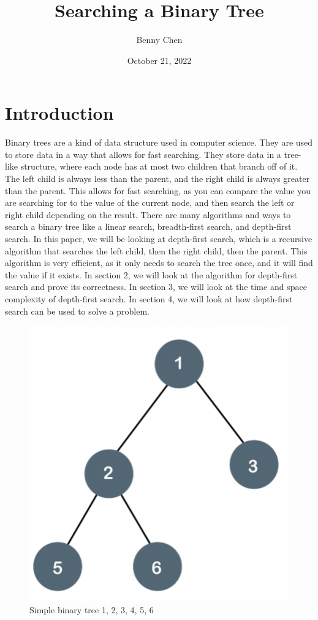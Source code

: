 \documentclass[12pt]{article}
\title{Searching a Binary Tree}
\author{Benny Chen}
\date{October 21, 2022}
\begin{document}
\maketitle

\section{Introduction}
Binary trees are a kind of data structure used in computer science.
They are used to store data in a way that allows for fast searching.
They store data in a tree-like structure, where each node has at most two children that branch off of it.
The left child is always less than the parent, and the right child is always greater than the parent.
This allows for fast searching, as you can compare the value you are searching for to the value of the current node, and then search the left or right child depending on the result.
There are many algorithms and ways to search a binary tree like
a linear search, breadth-first search, and depth-first search.
In this paper, we will be looking at depth-first search, which is a recursive algorithm that searches the left child, then the right child, then the parent.
This algorithm is very efficient, as it only needs to search the tree once, and it will find the value if it exists.
In section 2, we will look at the algorithm for depth-first search and prove its correctness.
In section 3, we will look at the time and space complexity of depth-first search.
In section 4, we will look at how depth-first search can be used to solve a problem.

\begin{figure}[h!]
    \centering
    \includegraphics[scale=.196]{images/tree.png}
    \caption{Simple binary tree 1, 2, 3, 4, 5, 6} 
\end{figure}
\end{document}
